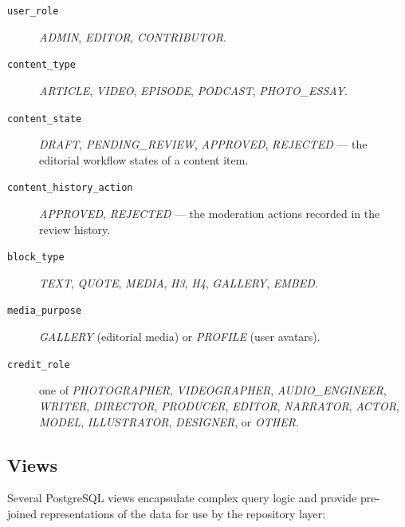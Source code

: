 \begin{description}
      \item[\texttt{user\_role}] \textit{ADMIN}, \textit{EDITOR}, \textit{CONTRIBUTOR}.

      \item[\texttt{content\_type}] \textit{ARTICLE}, \textit{VIDEO}, \textit{EPISODE},
            \textit{PODCAST}, \textit{PHOTO\_ESSAY}.

      \item[\texttt{content\_state}] \textit{DRAFT}, \textit{PENDING\_REVIEW},
            \textit{APPROVED}, \textit{REJECTED} --- the editorial workflow states of a
            content item.

      \item[\texttt{content\_history\_action}] \textit{APPROVED}, \textit{REJECTED} ---
            the moderation actions recorded in the review history.

      \item[\texttt{block\_type}] \textit{TEXT}, \textit{QUOTE}, \textit{MEDIA},
            \textit{H3}, \textit{H4}, \textit{GALLERY}, \textit{EMBED}.

      \item[\texttt{media\_purpose}] \textit{GALLERY} (editorial media) or
            \textit{PROFILE} (user avatars).

      \item[\texttt{credit\_role}] one of \textit{PHOTOGRAPHER}, \textit{VIDEOGRAPHER},
            \textit{AUDIO\_ENGINEER}, \textit{WRITER}, \textit{DIRECTOR}, \textit{PRODUCER},
            \textit{EDITOR}, \textit{NARRATOR}, \textit{ACTOR}, \textit{MODEL},
            \textit{ILLUSTRATOR}, \textit{DESIGNER}, or \textit{OTHER}.
\end{description}

\subsection{Views} \label{app:dm_views}

Several PostgreSQL views encapsulate complex query logic and provide pre-joined
representations of the data for use by the repository layer:

